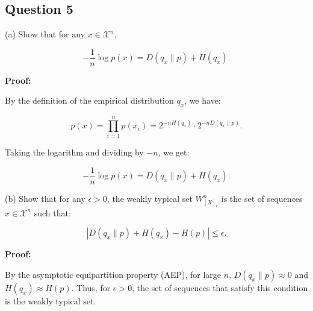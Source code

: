 \documentclass[a4paper,10pt]{article}
\begin{document}
\subsection*{Question 5}
(a) Show that for any $x \in \mathcal{X}^n$,

$$
- \frac{1}{n} \log p(x) = D(q_x \| p) + H(q_x).
$$

\textbf{Proof:}

By the definition of the empirical distribution $q_x$, we have:

$$
p(x) = \prod_{i=1}^n p(x_i) = 2^{-n H(q_x)} \cdot 2^{-n D(q_x \| p)}.
$$

Taking the logarithm and dividing by $-n$, we get:

$$
- \frac{1}{n} \log p(x) = D(q_x \| p) + H(q_x).
$$

(b) Show that for any $\epsilon > 0$, the weakly typical set $W_{[X]_{\epsilon}}^n$ is the set of sequences $x \in \mathcal{X}^n$ such that:

$$
|D(q_x \| p) + H(q_x) - H(p)| \leq \epsilon.
$$

\textbf{Proof:}

By the asymptotic equipartition property (AEP), for large $n$, $D(q_x \| p) \approx 0$ and $H(q_x) \approx H(p)$. Thus, for $\epsilon > 0$, the set of sequences that satisfy this condition is the weakly typical set.

\newpage
\fontsize{8}{9}\selectfont


\clearpage
\end{document}
